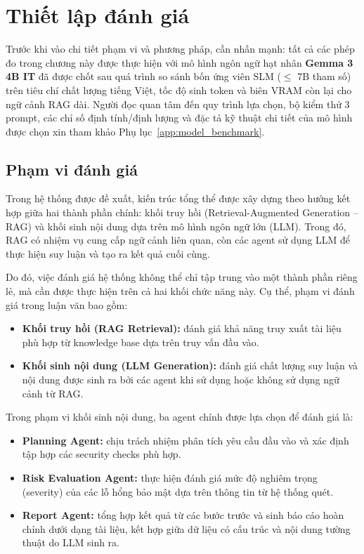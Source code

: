 \section{Thiết lập đánh giá}
\label{sec:eval_setup}

Trước khi vào chi tiết phạm vi và phương pháp, cần nhấn mạnh: tất cả các phép đo trong chương này được thực hiện với mô hình ngôn ngữ hạt nhân \textbf{Gemma 3 4B IT} đã được chốt sau quá trình so sánh bốn ứng viên SLM ($\le$ 7B tham số) trên tiêu chí chất lượng tiếng Việt, tốc độ sinh token và biên VRAM còn lại cho ngữ cảnh RAG dài. Người đọc quan tâm đến quy trình lựa chọn, bộ kiểm thử 3 prompt, các chỉ số định tính/định lượng và đặc tả kỹ thuật chi tiết của mô hình được chọn xin tham khảo Phụ lục~\ref{app:model_benchmark}.

\subsection{Phạm vi đánh giá}

Trong hệ thống được đề xuất, kiến trúc tổng thể được xây dựng theo hướng kết hợp giữa hai thành phần chính: khối truy hồi (Retrieval-Augmented Generation -- RAG) và khối sinh nội dung dựa trên mô hình ngôn ngữ lớn (LLM). Trong đó, RAG có nhiệm vụ cung cấp ngữ cảnh liên quan, còn các agent sử dụng LLM để thực hiện suy luận và tạo ra kết quả cuối cùng.

Do đó, việc đánh giá hệ thống không thể chỉ tập trung vào một thành phần riêng lẻ, mà cần được thực hiện trên cả hai khối chức năng này. Cụ thể, phạm vi đánh giá trong luận văn bao gồm:

\begin{itemize}
    \item \textbf{Khối truy hồi (RAG Retrieval):} đánh giá khả năng truy xuất tài liệu phù hợp từ knowledge base dựa trên truy vấn đầu vào.
    \item \textbf{Khối sinh nội dung (LLM Generation):} đánh giá chất lượng suy luận và nội dung được sinh ra bởi các agent khi sử dụng hoặc không sử dụng ngữ cảnh từ RAG.
\end{itemize}

Trong phạm vi khối sinh nội dung, ba agent chính được lựa chọn để đánh giá là:

\begin{itemize}
    \item \textbf{Planning Agent:} chịu trách nhiệm phân tích yêu cầu đầu vào và xác định tập hợp các security checks phù hợp.
    \item \textbf{Risk Evaluation Agent:} thực hiện đánh giá mức độ nghiêm trọng (severity) của các lỗ hổng bảo mật dựa trên thông tin từ hệ thống quét.
    \item \textbf{Report Agent:} tổng hợp kết quả từ các bước trước và sinh báo cáo hoàn chỉnh dưới dạng tài liệu, kết hợp giữa dữ liệu có cấu trúc và nội dung tường thuật do LLM sinh ra.
\end{itemize}

